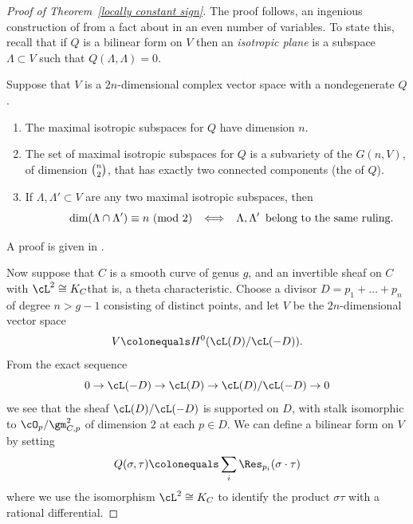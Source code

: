 \begin{proof}[Proof of Theorem~\ref{locally constant sign}]
The proof follows,
an ingenious construction of
%
from a  fact about
%
in an even
number of variables.
To state this, recall that if $Q$ is a  bilinear form on $V$ then an
\emph{isotropic plane} is a subspace $\Lambda \subset V$ such that
%
$Q(\Lambda, \Lambda) = 0$.

\smallbreak

\begin{fact}
\label{isotropic facts}
Suppose that $V$ is a $2n$-dimensional complex vector space with a
nondegenerate
%
$Q$.
\vadjust{\goodbreak}%
 \begin{enumerate}
\item The maximal isotropic subspaces for $Q$ have dimension $n$.

\item The set of maximal isotropic subspaces for $Q$ is a subvariety of
the
%
$G(n,V)$, of dimension $\tbinom{n}{2}$, that has exactly
two connected components (the
%
of $Q$).

\item If $\Lambda, \Lambda' \subset V$ are any two maximal isotropic
subspaces, then
$$
\let\quad\enspace
\null\hskip\leftmargini
\dim(\Lambda \cap \Lambda') \equiv n \text{ (mod 2)} \quad \iff \quad
\Lambda, \Lambda' \text{ \,belong to the same ruling.}
$$
\end{enumerate}

A  proof is given in \cite[pp.~735--740]{Griffiths-Harris1978}.
\end{fact}

Now suppose that $C$ is a smooth curve of genus $g$, and
an invertible sheaf on $C$ with $\cL^2 \cong K_C$\emdash that is, a theta
characteristic. Choose a divisor $D = p_1 + \dots + p_n$ of degree $n>
g-1$ consisting of distinct points, and let $V$ be the $2n$-dimensional
vector space
$$
V \colonequals  H^0( \cL(D) / \cL(-D) ).
$$
From the exact sequence
$$
0\to \cL(-D) \to \cL(D) \to \cL(D)/\cL(-D) \to 0
$$
we see that
the sheaf $ \cL(D) / \cL(-D)$ is supported on $D$, with stalk
isomorphic to $\cO_p/\gm_{C,p}^2$ of dimension 2 at each $p \in D$. We
can define a bilinear form on $V$ by setting
%
$$
Q(\sigma, \tau) \colonequals  \sum_i \Res_{p_i}(\sigma \cdot \tau)
\vspace*{-3pt}
$$
where we use the isomorphism $\cL^2 \cong K_C$ to identify the product
$\sigma\tau$ with a rational differential.


\end{proof}
